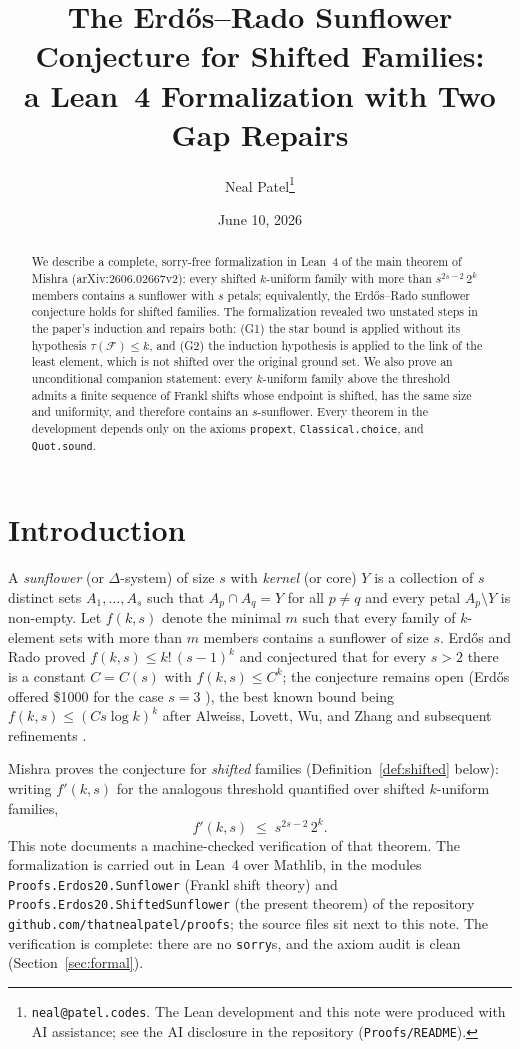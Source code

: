 \documentclass[11pt,a4paper]{article}
\title{The Erd\H{o}s--Rado Sunflower Conjecture for Shifted Families:\\
  a Lean~4 Formalization with Two Gap Repairs}
\author{Neal Patel\thanks{\texttt{neal@patel.codes}. The Lean development
  and this note were produced with AI assistance; see the AI disclosure in
  the repository (\texttt{Proofs/README}).}}
\date{June 10, 2026}
\theoremstyle{remark}
\newcommand{\cF}{\mathcal{F}}
\begin{document}
\maketitle

\begin{abstract}
We describe a complete, sorry-free formalization in Lean~4 of the main
theorem of Mishra (arXiv:2606.02667v2): every shifted $k$-uniform family
with more than $s^{2s-2}\,2^{k}$ members contains a sunflower with $s$
petals; equivalently, the Erd\H{o}s--Rado sunflower conjecture holds for
shifted families. The formalization revealed two unstated steps in the
paper's induction and repairs both: (G1) the star bound is applied
without its hypothesis $\tau(\cF)\le k$, and (G2) the induction
hypothesis is applied to the link of the least element, which is not
shifted over the original ground set. We also prove an unconditional
companion statement: every $k$-uniform family above the threshold
admits a finite sequence of Frankl shifts whose endpoint is shifted,
has the same size and uniformity, and therefore contains an
$s$-sunflower. Every theorem in the development depends only on the
axioms \texttt{propext}, \texttt{Classical.choice}, and
\texttt{Quot.sound}.
\end{abstract}

\section{Introduction}

A \emph{sunflower} (or $\Delta$-system) of size $s$ with \emph{kernel}
(or core) $Y$ is a collection of $s$ distinct sets $A_1,\dots,A_s$ such
that $A_p\cap A_q=Y$ for all $p\neq q$ and every petal
$A_p\setminus Y$ is non-empty. Let $f(k,s)$ denote the minimal $m$ such
that every family of $k$-element sets with more than $m$ members
contains a sunflower of size $s$. Erd\H{o}s and Rado \cite{ER60} proved
$f(k,s)\le k!\,(s-1)^{k}$ and conjectured that for every $s>2$ there is
a constant $C=C(s)$ with $f(k,s)\le C^{k}$; the conjecture remains open
(Erd\H{o}s offered \$1000 for the case $s=3$ \cite{Er81}), the best
known bound being $f(k,s)\le(Cs\log k)^{k}$ after Alweiss, Lovett, Wu,
and Zhang \cite{ALWZ20} and subsequent refinements \cite{Ra20,BCW21}.

Mishra \cite{Mi26} proves the conjecture for \emph{shifted} families
(Definition~\ref{def:shifted} below): writing $f'(k,s)$ for the
analogous threshold quantified over shifted $k$-uniform families,
\[
  f'(k,s)\;\le\; s^{2s-2}\,2^{k}.
\]
This note documents a machine-checked verification of that theorem.
The formalization is carried out in Lean~4 over Mathlib, in the modules
\texttt{Proofs.Erdos20.Sunflower} (Frankl shift theory) and
\texttt{Proofs.Erdos20.ShiftedSunflower} (the present theorem) of the
repository \texttt{github.com/thatnealpatel/proofs}; the source files
sit next to this note. The verification is complete: there are no
\texttt{sorry}s, and the axiom audit is clean
(Section~\ref{sec:formal}).
\end{document}
